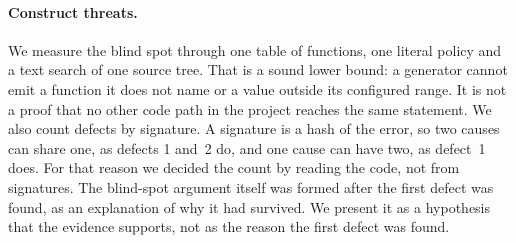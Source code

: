 \paragraph{Construct threats.} We measure the blind spot through one table of
functions, one literal policy and a text search of one source tree. That is a
sound lower bound: a generator cannot emit a function it does not name or a value
outside its configured range. It is not a proof that no other code path in the
project reaches the same statement. We also count defects by signature. A
signature is a hash of the error, so two causes can share one, as defects 1
and~2 do, and one cause can have two, as defect~1 does. For that reason we
decided the count by reading the code, not from signatures. The blind-spot
argument itself was formed after the first defect was found, as an explanation
of why it had survived. We present it as a hypothesis that the evidence
supports, not as the reason the first defect was found.
